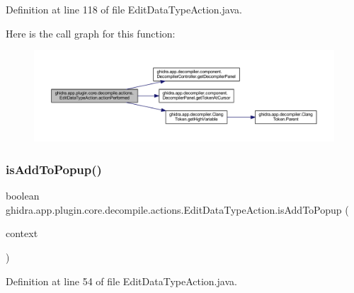 Definition at line 118 of file Edit\+Data\+Type\+Action.\+java.

Here is the call graph for this function\+:
\nopagebreak
\begin{figure}[H]
\begin{center}
\leavevmode
\includegraphics[width=350pt]{classghidra_1_1app_1_1plugin_1_1core_1_1decompile_1_1actions_1_1_edit_data_type_action_a6aab83764bae24945ea130a5bedc2da8_cgraph}
\end{center}
\end{figure}
\mbox{\label{classghidra_1_1app_1_1plugin_1_1core_1_1decompile_1_1actions_1_1_edit_data_type_action_a3740c7acec5cdd01522f8d5bb6696a36}} 
\subsubsection{\texorpdfstring{isAddToPopup()}{isAddToPopup()}}
{\footnotesize\ttfamily boolean ghidra.\+app.\+plugin.\+core.\+decompile.\+actions.\+Edit\+Data\+Type\+Action.\+is\+Add\+To\+Popup (\begin{DoxyParamCaption}\item[{Action\+Context}]{context }\end{DoxyParamCaption})\hspace{0.3cm}{\ttfamily [inline]}}



Definition at line 54 of file Edit\+Data\+Type\+Action.\+java.

